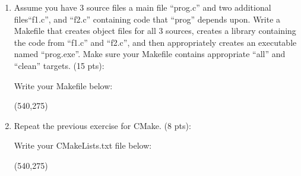 \documentclass[10pt]{article}
\begin{document}
\begin{enumerate}
\item Assume you have 3 source files a main file ``prog.c'' and two additional files``f1.c'', and ``f2.c'' containing code that ``prog'' depends upon. Write a Makefile that creates object files for all 3 sources, creates a library containing the code from ``f1.c'' and ``f2.c'', and then appropriately creates an executable named ``prog.exe''. Make sure your Makefile contains appropriate ``all'' and ``clean'' targets. (15 pts):
\bigskip

Write your Makefile below:

\hspace*{-0.4in}\framebox(540,275){}

\item Repeat the previous exercise for CMake.  (8 pts):
\bigskip

Write your CMakeLists.txt file below:

\hspace*{-0.4in}\framebox(540,275){}


\end{enumerate}
\end{document}
